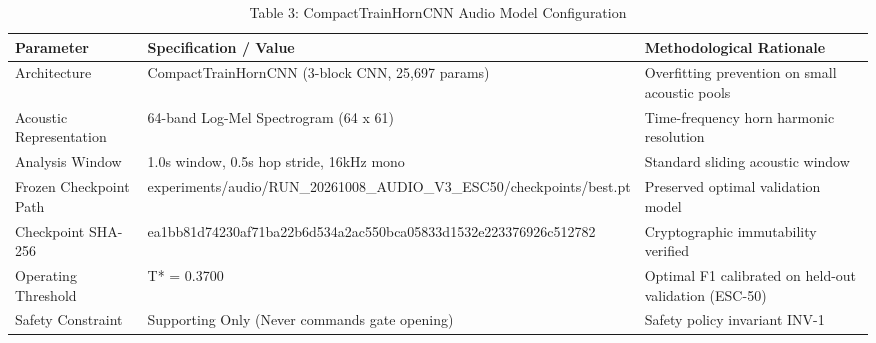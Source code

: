 \begin{table}[t]
\centering
\caption{Table 3: CompactTrainHornCNN Audio Model Configuration}
\label{tab:table03_audio_model_config}
\begin{tabular}{lll}
\hline
Parameter & Specification / Value & Methodological Rationale \\
\hline
Architecture & CompactTrainHornCNN (3-block CNN, 25,697 params) & Overfitting prevention on small acoustic pools \\
Acoustic Representation & 64-band Log-Mel Spectrogram (64 x 61) & Time-frequency horn harmonic resolution \\
Analysis Window & 1.0s window, 0.5s hop stride, 16kHz mono & Standard sliding acoustic window \\
Frozen Checkpoint Path & experiments/audio/RUN\_20261008\_AUDIO\_V3\_ESC50/checkpoints/best.pt & Preserved optimal validation model \\
Checkpoint SHA-256 & ea1bb81d74230af71ba22b6d534a2ac550bca05833d1532e223376926c512782 & Cryptographic immutability verified \\
Operating Threshold & T* = 0.3700 & Optimal F1 calibrated on held-out validation (ESC-50) \\
Safety Constraint & Supporting Only (Never commands gate opening) & Safety policy invariant INV-1 \\
\hline
\end{tabular}
\end{table}
